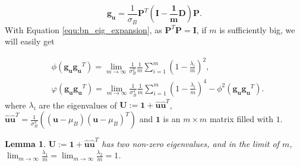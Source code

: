 \documentclass[10pt,journal,compsoc]{IEEEtran}
\newtheorem{lemma}[theorem]{Lemma}
\begin{document}
\begin{equation}
    \mathbf{g_u} = \frac{1}{\sigma_B}\mathbf{P}^T(\mathbf{I - \frac{1}{m}\mathbf{D}})\mathbf{P}.
\label{equ:bn_eig_expansion}
\end{equation}
With Equation \eqref{equ:bn_eig_expansion}, as $\mathbf{P}^T\mathbf{P}=\mathbf{I}$, if $m$ is sufficiently big, we will easily get

\begin{equation}
\begin{split}
    &\phi(\mathbf{g_ug_u}^T) = \lim_{m\rightarrow\infty} \frac{1}{\sigma_B^2}\frac{1}{m}\sum_{i=1}^m(1-\frac{\lambda_i}{m})^2,\\
    &\varphi(\mathbf{g_ug_u}^T) = \lim_{m\rightarrow\infty} \frac{1}{\sigma_B^4}\frac{1}{m}\sum_{i=1}^m(1-\frac{\lambda_i}{m})^4 - \phi^2(\mathbf{g_ug_u}^T).
\end{split}
\label{equ:eig_bn_pre}
\end{equation}
where $\lambda_i$ are the eigenvalues of $\mathbf{U}:= \mathbf{1}+\hat{\mathbf{u}}\hat{\mathbf{u}}^T$, $\hat{\mathbf{u}}\hat{\mathbf{u}}^T = \frac{1}{\sigma_B^2}\left((\mathbf{u} - \mu_B)(\mathbf{u} - \mu_B)^T\right)$ and $\mathbf{1}$ is an $m\times m$ matrix filled with $1$.
\begin{lemma}
 $\mathbf{U}:= \mathbf{1}+\hat{\mathbf{u}}\hat{\mathbf{u}}^T$ has two non-zero eigenvalues, and in the limit of $m$, $\lim_{m\rightarrow\infty}\frac{\lambda_1}{m}=\lim_{m\rightarrow\infty}\frac{\lambda_2}{m}=1$.
 \label{lemma:eig_bn}
\end{lemma}
\end{document}
